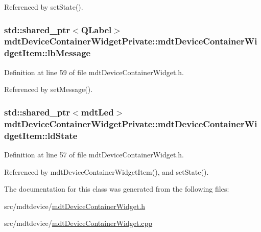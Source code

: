 Referenced by set\-State().

\hypertarget{classmdt_device_container_widget_private_1_1mdt_device_container_widget_item_af2dffac7204f93f210794c6800f54b28}{
\subsubsection[{lb\-Message}]{\setlength{\rightskip}{0pt plus 5cm}std\-::shared\-\_\-ptr$<$Q\-Label$>$ mdt\-Device\-Container\-Widget\-Private\-::mdt\-Device\-Container\-Widget\-Item\-::lb\-Message}}\label{classmdt_device_container_widget_private_1_1mdt_device_container_widget_item_af2dffac7204f93f210794c6800f54b28}


Definition at line 59 of file mdt\-Device\-Container\-Widget.\-h.



Referenced by set\-Message().

\hypertarget{classmdt_device_container_widget_private_1_1mdt_device_container_widget_item_affa159e1f4c9b4392e2339ae067d2f0f}{
\subsubsection[{ld\-State}]{\setlength{\rightskip}{0pt plus 5cm}std\-::shared\-\_\-ptr$<${\bf mdt\-Led}$>$ mdt\-Device\-Container\-Widget\-Private\-::mdt\-Device\-Container\-Widget\-Item\-::ld\-State}}\label{classmdt_device_container_widget_private_1_1mdt_device_container_widget_item_affa159e1f4c9b4392e2339ae067d2f0f}


Definition at line 57 of file mdt\-Device\-Container\-Widget.\-h.



Referenced by mdt\-Device\-Container\-Widget\-Item(), and set\-State().



The documentation for this class was generated from the following files\-:\begin{DoxyCompactItemize}
\item 
src/mdtdevice/\hyperlink{mdt_device_container_widget_8h}{mdt\-Device\-Container\-Widget.\-h}\item 
src/mdtdevice/\hyperlink{mdt_device_container_widget_8cpp}{mdt\-Device\-Container\-Widget.\-cpp}\end{DoxyCompactItemize}
